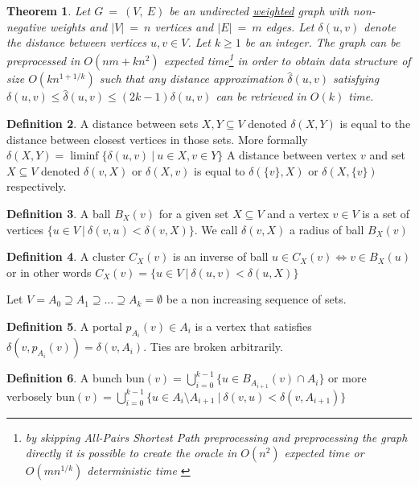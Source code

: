 \documentclass[shortabstract, lic, english]{iithesis}
\theoremstyle{definition} \newtheorem{definition}{Definition}[chapter]
\theoremstyle{plain} \newtheorem{remark}[definition]{Observation}
\theoremstyle{plain} \newtheorem{theorem}[definition]{Theorem}
\theoremstyle{plain} \newtheorem{lemma}[definition]{Lemma}
\theoremstyle{plain} \newtheorem{conjecture}[definition]{Conjecture}
\begin{document}
\begin{theorem}
Let $G~=~(V,~E)$ be an undirected \underline{weighted} graph with non-negative weights and $|V|~=~n$ vertices and $|E|~=~m$ edges.
Let $\delta(u,v)$ denote the distance between vertices $u,v \in V$.
Let $k\geq1$ be an integer. The graph can be preprocessed in $O(nm + kn^2)$ expected time\footnote{
    by skipping All-Pairs Shortest Path preprocessing and preprocessing the graph directly it is possible to create the oracle in $O(n^2)$ expected time \cite{a0OraclesN2Time} or $O(mn^{1/k})$ deterministic time \cite{a0OraclesMN1KDeterministicTime}}
in order to obtain data structure of size $O(kn^{1+1/k})$ such that any distance approximation
$\hat{\delta}(u,v)$ satisfying $\delta(u,v)\leq \hat{\delta}(u,v)\leq (2k-1)\delta(u, v)$
can be retrieved in $O(k)$ time.
\end{theorem}

\begin{definition}
    A distance between sets $X, Y \subseteq V$ denoted $\delta(X,Y)$ is equal to the distance
    between closest vertices in those sets. 
    More formally $\delta(X,Y) = \liminf\{\delta(u,v) ~|~ u\in X, v\in Y\}$
    A distance between vertex $v$ and set $X \subseteq V$ denoted $\delta(v,X)$ or $\delta(X,v)$
    is equal to $\delta(\{v\},X)$ or $\delta(X,\{v\})$ respectively.
\end{definition}

\begin{definition}
    A ball $B_X(v)$ for a given set $X \subseteq V$ and a vertex $v\in V$
    is a set of vertices $\{u \in V ~|~ \delta(v,u) < \delta(v, X)\}$. We call $\delta(v, X)$ a radius of ball $B_X(v)$
\end{definition}

\begin{definition}
    A cluster $C_X(v)$ is an inverse of ball 
    $u\in C_X(v) \iff v\in B_X(u)$ or in other words
    $C_X(v) = \{u \in V ~|~ \delta(u,v) < \delta(u, X)\}$
\end{definition}

Let $V = A_0 \supseteq A_1 \supseteq \ldots \supseteq A_k = \emptyset$ be a non increasing 
sequence of sets.

\begin{definition}
    A portal $p_{A_i}(v) \in A_i$ is a vertex that satisfies $\delta(v, p_{A_i}(v)) = \delta(v, A_i)$. Ties are broken arbitrarily. 
\end{definition}

\begin{definition}
    A bunch bun$(v) = \bigcup_{i=0}^{k-1}\{ u \in B_{A_{i+1}}(v) \cap A_i \}$
    \newline
    or more verbosely bun$(v) = \bigcup_{i=0}^{k-1}\{ u\in A_i \setminus A_{i+1} ~|~ \delta(v,u) < \delta(v, A_{i+1}) \}$
\end{definition}
\end{document}
